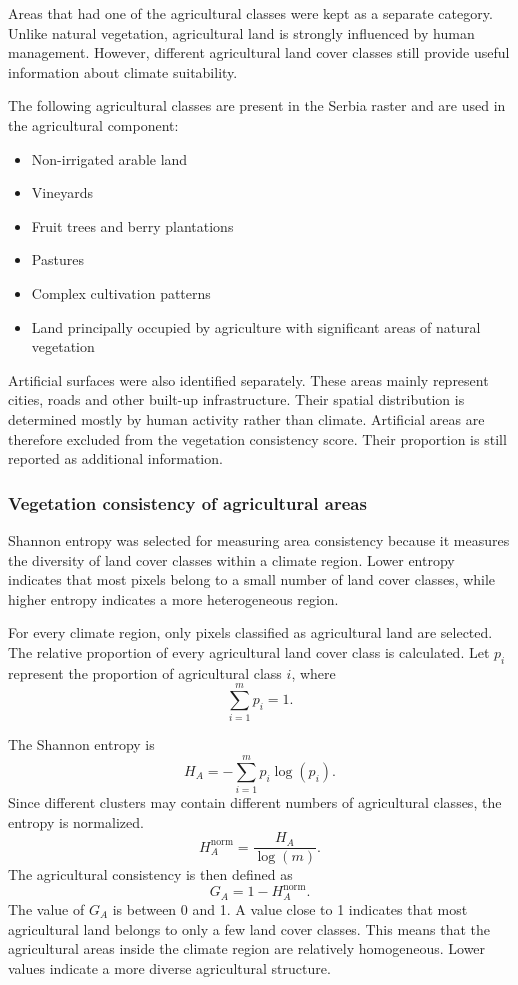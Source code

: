 \documentclass[11pt]{article}
\begin{document}
Areas that had one of the agricultural classes were kept as a separate category. Unlike natural vegetation, agricultural land is strongly influenced by human management. However, different agricultural land cover classes still provide useful information about climate suitability.

The following agricultural classes are present in the Serbia raster and are used in the agricultural component:
\begin{itemize}
  \item Non-irrigated arable land
  \item Vineyards
  \item Fruit trees and berry plantations
  \item Pastures
  \item Complex cultivation patterns
  \item Land principally occupied by agriculture with significant areas of natural vegetation
\end{itemize}

Artificial surfaces were also identified separately. These areas mainly represent cities, roads and other built-up infrastructure. Their spatial distribution is determined mostly by human activity rather than climate. Artificial areas are therefore excluded from the vegetation consistency score. Their proportion is still reported as additional information.

\subsubsection{Vegetation consistency of agricultural areas}
Shannon entropy was selected for measuring area consistency because it measures the diversity of land cover classes within a climate region. Lower entropy indicates that most pixels belong to a small number of land cover classes, while higher entropy indicates a more heterogeneous region.

For every climate region, only pixels classified as agricultural land are selected. The relative proportion of every agricultural land cover class is calculated. Let $p_i$ represent the proportion of agricultural class $i$, where
\[
\sum_{i=1}^{m} p_i = 1.
\]

The Shannon entropy is
\[
H_A=-\sum_{i=1}^{m} p_i \log(p_i).
\]
Since different clusters may contain different numbers of agricultural classes, the entropy is normalized.
\[
H_A^{\mathrm{norm}}
=
\frac{H_A}{\log(m)}.
\]
The agricultural consistency is then defined as
\[
G_A
=
1-H_A^{\mathrm{norm}}.
\]
The value of $G_A$ is between 0 and 1. A value close to 1 indicates that most agricultural land belongs to only a few land cover classes. This means that the agricultural areas inside the climate region are relatively homogeneous. Lower values indicate a more diverse agricultural structure.
\end{document}
